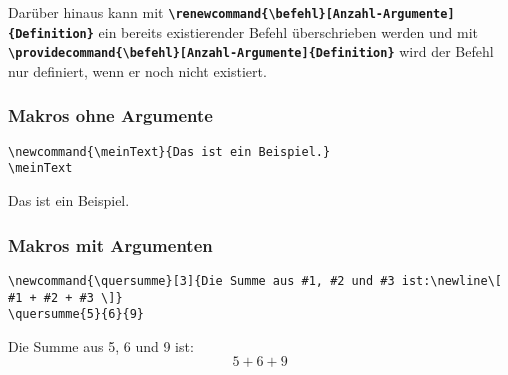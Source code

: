 Darüber hinaus kann mit \textbf{\texttt{\textbackslash renewcommand\{\textbackslash befehl\}[Anzahl-Argumente]\{Definition\}}} ein bereits existierender Befehl überschrieben werden und mit \newline \textbf{\texttt{\textbackslash providecommand\{\textbackslash befehl\}[Anzahl-Argumente]\{Definition\}}} wird der Befehl nur definiert, wenn er noch nicht existiert.

\subsubsection{Makros ohne Argumente}

\begin{minipage}[c]{0.65\textwidth}
    \begin{lstlisting}[language={[LaTeX]TeX}]
\newcommand{\meinText}{Das ist ein Beispiel.}
\meinText
        \end{lstlisting}
\end{minipage}
\hfill
\begin{minipage}[c]{0.3\textwidth}
    \newcommand{\meinText}{Das ist ein Beispiel.}
    \meinText
\end{minipage}

\subsubsection{Makros mit Argumenten}

\begin{minipage}[c]{0.65\textwidth}
    \begin{lstlisting}[language={[LaTeX]TeX}]
\newcommand{\quersumme}[3]{Die Summe aus #1, #2 und #3 ist:\newline\[ #1 + #2 + #3 \]}
\quersumme{5}{6}{9}
        \end{lstlisting}
\end{minipage}
\hfill
\begin{minipage}[c]{0.3\textwidth}
    \newcommand{\quersumme}[3]{Die Summe aus #1, #2 und #3 ist:\newline\[ #1 + #2 + #3 \]}
    \quersumme{5}{6}{9}
\end{minipage}